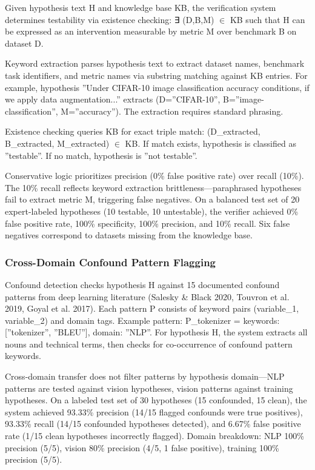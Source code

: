 Given hypothesis text H and knowledge base KB, the verification system determines testability via existence checking: ∃ (D,B,M) $\in$ KB such that H can be expressed as an intervention measurable by metric M over benchmark B on dataset D.

Keyword extraction parses hypothesis text to extract dataset names, benchmark task identifiers, and metric names via substring matching against KB entries. For example, hypothesis ''Under CIFAR-10 image classification accuracy conditions, if we apply data augmentation...'' extracts (D=''CIFAR-10'', B=''image-classification'', M=''accuracy''). The extraction requires standard phrasing.

Existence checking queries KB for exact triple match: (D\_extracted, B\_extracted, M\_extracted) $\in$ KB. If match exists, hypothesis is classified as ''testable''. If no match, hypothesis is ''not testable''.

Conservative logic prioritizes precision (0\% false positive rate) over recall (10\%). The 10\% recall reflects keyword extraction brittleness---paraphrased hypotheses fail to extract metric M, triggering false negatives. On a balanced test set of 20 expert-labeled hypotheses (10 testable, 10 untestable), the verifier achieved 0\% false positive rate, 100\% specificity, 100\% precision, and 10\% recall. Six false negatives correspond to datasets missing from the knowledge base.

\subsubsection{Cross-Domain Confound Pattern Flagging}

Confound detection checks hypothesis H against 15 documented confound patterns from deep learning literature (Salesky \& Black 2020, Touvron et al. 2019, Goyal et al. 2017). Each pattern P consists of keyword pairs (variable\_1, variable\_2) and domain tags. Example pattern: P\_tokenizer = {keywords: [''tokenizer'', ''BLEU''], domain: ''NLP''}. For hypothesis H, the system extracts all nouns and technical terms, then checks for co-occurrence of confound pattern keywords.

Cross-domain transfer does not filter patterns by hypothesis domain---NLP patterns are tested against vision hypotheses, vision patterns against training hypotheses. On a labeled test set of 30 hypotheses (15 confounded, 15 clean), the system achieved 93.33\% precision (14/15 flagged confounds were true positives), 93.33\% recall (14/15 confounded hypotheses detected), and 6.67\% false positive rate (1/15 clean hypotheses incorrectly flagged). Domain breakdown: NLP 100\% precision (5/5), vision 80\% precision (4/5, 1 false positive), training 100\% precision (5/5).


